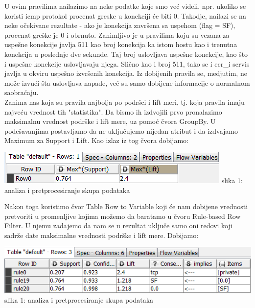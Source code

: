 \documentclass[10pt]{article}
\begin{document}
U ovim pravilima nailazimo na neke podatke koje smo ve\' c videli, npr. ukoliko se koristi icmp protokol procenat greske u konekciji \' ce biti 0. Takodje, nailazi se na neke o\v cekivane rezultate - ako je konekcija zavr\v sena sa uspehom (flag = SF), procenat gre\v ske \' je 0 i obrnuto.
Zanimljivo je u pravilima koju su vezana za uspe\v sne konekcije javlja 511 kao broj konekcija ka istom hostu kao i trenutna konekcija u poslednje dve sekunde. Taj broj uslovljava uspe\v sne konekcije, kao \v sto i uspe\v sne konekcije uslovljavaju njega. Sli\v cno kao i broj 511, tako se i ecr\_i servis javlja u okviru uspe\v sno izvr\v senih konekcija. Iz dobijenih pravila se, medjutim, ne mo\v ze izvu\' ci \v sta uslovljava napade, ve\' c su samo dobijene informacije o normalnom saobra\' caju.\\
Zanima nas koja su pravila najbolja po podr\v sci i lift meri, tj. koja pravila imaju najve\' cu vrednost tih "statistika". Da bismo ih izdvojili prvo pronalazimo maksimalnu vrednost podr\v ske i lift mere, uz pomo\' c \v cvora GroupBy. U pode\v savanjima postavljamo da ne uklju\v cujemo nijedan atribut i da izdvajamo Maximum za Support i Lift. Kao izlaz iz tog \v cvora dobijamo:

\begin{center}
\includegraphics[width = \textwidth]{PP4}
slika 1: analiza i pretprocesiranje skupa podataka\\
\end{center}

Nakon toga koristimo \v cvor Table Row to Variable koji \' ce nam dobijene vrednosti pretvoriti u promenljive kojima mo\v zemo da baratamo u \v cvoru Rule-based Row Filter. U njemu zadajemo da nam se u rezultat uklju\v ce samo oni redovi koji sadr\v ze date maksimalne vrednosti podr\v ske i lift mere. Dobijamo:

\begin{center}
\includegraphics[width = \textwidth]{PP5}
slika 1: analiza i pretprocesiranje skupa podataka\\
\end{center}
\end{document}
